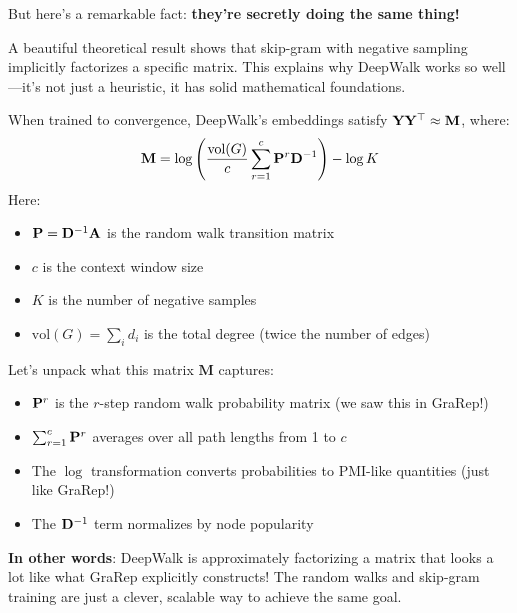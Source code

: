 \begin{notechapter}
\begin{whybox}
But here's a remarkable fact: \textbf{they're secretly doing the same thing!} 

A beautiful theoretical result shows that skip-gram with negative sampling implicitly factorizes a specific matrix. This explains why DeepWalk works so well---it's not just a heuristic, it has solid mathematical foundations.
\end{whybox}

\begin{theorem}
When trained to convergence, DeepWalk's embeddings satisfy $\mathbf{Y} \mathbf{Y}^\top \approx \mathbf{M}$, where:
\[
\mathbf{M} = \log\left(\frac{\text{vol}(G)}{c} \sum_{r=1}^{c} \mathbf{P}^r \mathbf{D}^{-1}\right) - \log K
\]
Here:
\begin{itemize}
    \item $\mathbf{P} = \mathbf{D}^{-1}\mathbf{A}$ is the random walk transition matrix
    \item $c$ is the context window size
    \item $K$ is the number of negative samples
    \item $\text{vol}(G) = \sum_i d_i$ is the total degree (twice the number of edges)
\end{itemize}
\end{theorem}

\begin{intuition}
Let's unpack what this matrix $\mathbf{M}$ captures:

\begin{itemize}
    \item $\mathbf{P}^r$ is the $r$-step random walk probability matrix (we saw this in GraRep!)
    \item $\sum_{r=1}^{c} \mathbf{P}^r$ averages over all path lengths from 1 to $c$
    \item The $\log$ transformation converts probabilities to PMI-like quantities (just like GraRep!)
    \item The $\mathbf{D}^{-1}$ term normalizes by node popularity
\end{itemize}

\textbf{In other words}: DeepWalk is approximately factorizing a matrix that looks a lot like what GraRep explicitly constructs! The random walks and skip-gram training are just a clever, scalable way to achieve the same goal.
\end{intuition}


\end{notechapter}
